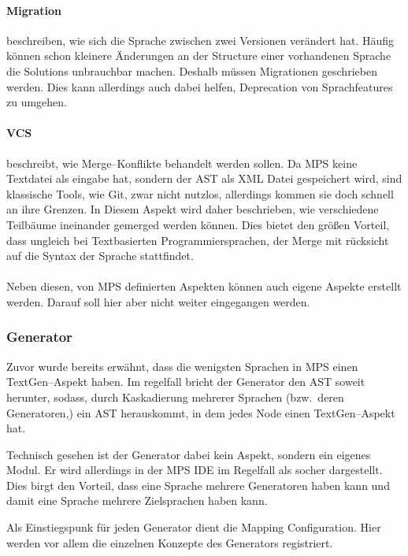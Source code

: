 \paragraph{Migration} beschreiben, wie sich die Sprache zwischen zwei Versionen verändert hat.
Häufig können schon kleinere Änderungen an der Structure einer vorhandenen Sprache die Solutions unbrauchbar machen.
Deshalb müssen Migrationen geschrieben werden.
Dies kann allerdings auch dabei helfen, Deprecation von Sprachfeatures zu umgehen.

\paragraph{\ac{VCS}} beschreibt, wie Merge--Konflikte behandelt werden sollen.
Da \ac{MPS} keine Textdatei als eingabe hat, sondern der \ac{AST} als XML Datei gespeichert wird, sind klassische Tools, wie Git, zwar nicht nutzlos, allerdings kommen sie doch schnell an ihre Grenzen.
In Diesem Aspekt wird daher beschrieben, wie verschiedene Teilbäume ineinander gemerged werden können.
Dies bietet den größen Vorteil, dass ungleich bei Textbasierten Programmiersprachen, der Merge mit rücksicht auf die Syntax der Sprache stattfindet.

\paragraph*{}
Neben diesen, von \ac{MPS} definierten Aspekten können auch eigene Aspekte erstellt werden.
Darauf soll hier aber nicht weiter eingegangen werden.

\subsubsection{Generator}
Zuvor wurde bereits erwähnt, dass die wenigsten Sprachen in \ac{MPS} einen TextGen--Aspekt haben.
Im regelfall bricht der Generator den \ac{AST} soweit herunter, sodass, durch Kaskadierung mehrerer Sprachen (bzw.\ deren Generatoren,) ein \ac{AST} herauskommt, in dem jedes Node einen TextGen--Aspekt hat.

Technisch gesehen ist der Generator dabei kein Aspekt, sondern ein eigenes Modul.
Er wird allerdings in der \ac{MPS} \ac{IDE} im Regelfall als socher dargestellt.
Dies birgt den Vorteil, dass eine Sprache mehrere Generatoren haben kann und damit eine Sprache mehrere Zielsprachen haben kann.

Als Einstiegspunk für jeden Generator dient die {\ttfamily Mapping Configuration}.
Hier werden vor allem die einzelnen Konzepte des Generators registriert.


